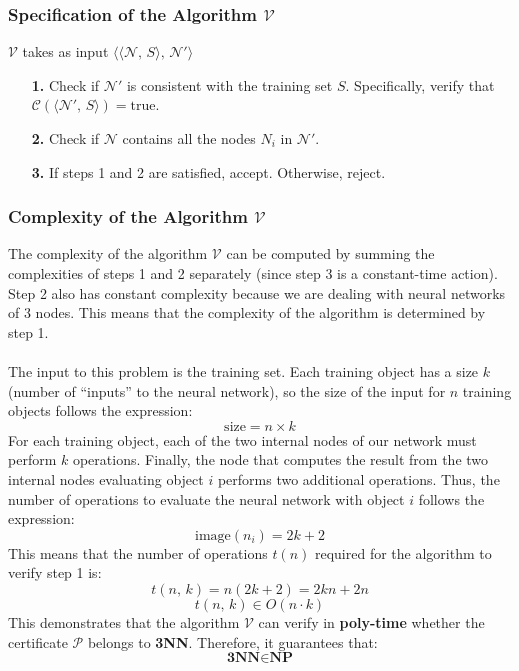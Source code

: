 \documentclass[../main]{subfiles}
\begin{document}
\subsubsection{Specification of the Algorithm $\mathcal{V}$}
$\mathcal{V}$ takes as input $\langle\langle \mathcal{N}, \, S \rangle, \, \mathcal{N}' \rangle$
\begin{enumerate}
\item[\textbf{1.}] Check if $\mathcal{N}'$ is consistent with the training set $S$. Specifically, verify that $\mathcal{C}(\langle \mathcal{N}', \, S \rangle) = \text{true}$.
\item[\textbf{2.}] Check if $\mathcal{N}$ contains all the nodes $N_i$ in $\mathcal{N}'$.
\item[\textbf{3.}] If steps 1 and 2 are satisfied, accept. Otherwise, reject.
\end{enumerate}

\subsubsection{Complexity of the Algorithm $\mathcal{V}$}
The complexity of the algorithm $\mathcal{V}$ can be computed by summing the complexities of steps 1 and 2 separately (since step 3 is a constant-time action). Step 2 also has constant complexity because we are dealing with neural networks of 3 nodes. This means that the complexity of the algorithm is determined by step 1. \\ \\
The input to this problem is the training set. Each training object has a size $k$ (number of ``inputs'' to the neural network), so the size of the input for $n$ training objects follows the expression:
\begin{equation*}
    \text{size} = n \times k
\end{equation*}
For each training object, each of the two internal nodes of our network must perform $k$ operations. Finally, the node that computes the result from the two internal nodes evaluating object $i$ performs two additional operations. Thus, the number of operations to evaluate the neural network with object $i$ follows the expression: 
\begin{equation*}
    \text{image}(n_i) = 2k + 2
\end{equation*}
This means that the number of operations $t(n)$ required for the algorithm to verify step 1 is:
\begin{equation*}
    t(n,\,k) = n(2k + 2) = 2kn + 2n
\end{equation*}
\begin{equation*}
    t(n,\,k) \in O(n \cdot k)
\end{equation*}
This demonstrates that the algorithm $\mathcal{V}$ can verify in \textbf{poly-time} whether the certificate $\mathcal{P}$ belongs to \textbf{3NN}. Therefore, it guarantees that:
\begin{equation*}
    \textbf{3NN} \in \textbf{NP}
\end{equation*}
\end{document}
